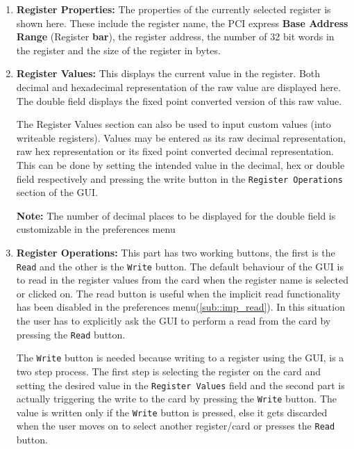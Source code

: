 \begin{enumerate}
	\item \textbf{Register Properties:} The properties of the currently selected
    register is shown here. These include the register name, the PCI express
    \textbf{Base Address Range} (Register \textbf{bar}), the register address,
    the number of 32 bit words in the register and the size of the register in
    bytes.

	\item \textbf{Register Values:} This displays the current value in the register.
    Both decimal and hexadecimal representation of the raw value are displayed
    here. The double field displays the fixed point converted version of this raw value.
    
	The Register Values section can also be used to input custom values (into writeable registers).
    Values may be entered as its raw decimal representation, raw hex representation or 
    its fixed point converted decimal representation. This can be done by setting the
    intended value in the decimal, hex or double field respectively and pressing the write button in
    the \texttt{Register Operations} section of the GUI. 
    
    \textbf{Note:} The number of decimal
    places to be displayed for the double field is customizable in the preferences menu 

	\item \textbf{Register Operations:} \label{itm:Register_Operations} This part
    has two working buttons, the first is the \texttt{Read} and the other is the
    \texttt{Write} button. The default behaviour of the GUI is to read in the
    register values from the card when the register name is selected or clicked
    on. The read button is useful when the implicit read functionality has been
    disabled in the preferences menu(\ref{sub::imp_read}). In this situation the
    user has to explicitly ask the GUI to perform a read from the card by
    pressing the \texttt{Read} button.

	The \texttt{Write} button is needed because writing to a register using the GUI,
	is a two step process. The first step is selecting the register on the card and
	setting the desired value in the \texttt{Register Values} field and the second
	part is actually triggering the write to the card by pressing the \texttt{Write}
	button. The value is written only if the \texttt{Write} button is pressed, else
	it gets discarded when the user moves on to select another register/card or
	presses the \texttt{Read} button. 


\end{enumerate}
